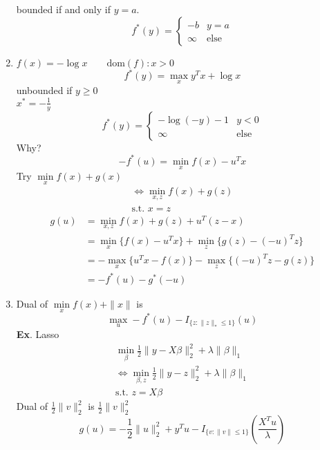 \documentclass[10pt]{article}
\begin{document}
\begin{enumerate}
bounded if and only if $y = a$.
\begin{equation*}
f^*(y) = \left\{
\begin{array}{ll}
-b &  y = a\\
\infty & \text{else}
\end{array}
\right.
\end{equation*}
\item $f(x) = -\log x \qquad \text{dom}(f): x > 0$
\begin{equation*}
f^*(y) = \max\limits_x y^T x + \log x
\end{equation*}
unbounded if $y \ge 0$\\
$x^* = -\frac{1}{y}$
\begin{equation*}
f^*(y) = \left\{
\begin{array}{ll}
-\log(-y) - 1 & y<0\\
\infty	& \text{else}
\end{array}\right.
\end{equation*}
Why?
\begin{equation*}
-f^*(u) = \min\limits_x f(x) - u^T x
\end{equation*}
Try $\min\limits_x f(x) + g(x)$
\begin{align*}
\Longleftrightarrow \min\limits_{x, z} f(x) + g(z)\\
\text{s.t. } x = z
\end{align*}
\begin{align*}
g(u) &= \min\limits_{x, z} f(x) + g(z) + u^T(z-x)\\
&= \min\limits_x \{f(x) - u^T x\} + \min_z\{g(z) - (-u)^T z\}\\
&= -\max\limits_x\{u^Tx - f(x)\} - \max\limits_z\{(-u)^T z - g(z)\}\\
&= -f^*(u) - g^*(-u)
\end{align*}
\item Dual of $\min\limits_x f(x) + \|x\|$ is
\begin{equation*}
\max\limits_u - f^*(u) - I_{\{z:\|z\|_*\le 1\}}(u)
\end{equation*}
\textbf{Ex}. Lasso
\begin{align*}
\min\limits_\beta \frac{1}{2} \|y - X\beta \|_2^2 + \lambda \|\beta\|_1\\
\Longleftrightarrow \min\limits_{\beta, z}\frac{1}{2} \|y - z\|_2^2 + \lambda\|\beta\|_1\\
\text{s.t. } z = X\beta
\end{align*}
Dual of $\frac{1}{2}\|v\|_2^2$ is $\frac{1}{2} \|v\|_2^2$
\begin{equation*}
g(u) = - \frac{1}{2}\|u\|_2^2 + y^T u - I_{\{v:\|v\|\le 1\}} (\frac{X^T u}{\lambda})
\end{equation*}
\end{enumerate}




\end{document}
